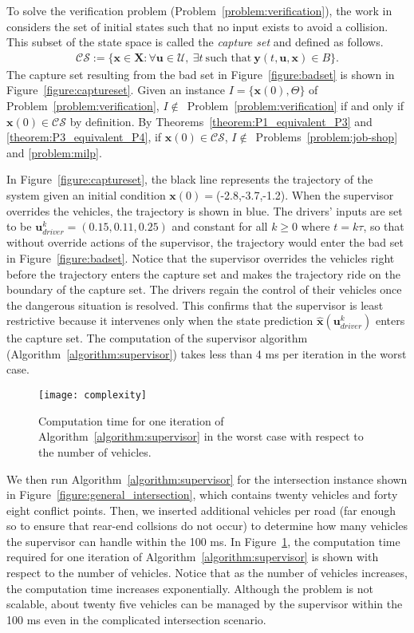 \documentclass{sig-alternate}
\begin{document}
To solve the verification problem (Problem~\ref{problem:verification}), the work in \cite{hafner_cooperative_2013} considers the set of initial states such that no input exists to avoid a collision. This subset of the state space is called the \textit{capture set} and defined as follows.
	\begin{align}\label{equation:capture_Set}
	\mathcal{CS}:=\{\mathbf{x}\in \mathbf{X}: \forall \mathbf{u}\in\mathcal{U},~\exists t~\text{such that}~\mathbf{y}(t,\mathbf{u},\mathbf{x})\in B\}.
	\end{align}
	The capture set resulting from the bad set in Figure~\ref{figure:badset} is shown in Figure~\ref{figure:captureset}.
Given an instance $I=\{\mathbf{x}(0),\Theta\}$ of Problem~\ref{problem:verification}, $I\notin$~Problem~\ref{problem:verification} if and only if $\mathbf{x}(0)\in \mathcal{CS}$ by definition. By Theorems~\ref{theorem:P1_equivalent_P3} and \ref{theorem:P3_equivalent_P4}, if $\mathbf{x}(0)\in\mathcal{CS}$, $I\notin$~Problems~\ref{problem:job-shop} and \ref{problem:milp}.

In Figure~\ref{figure:captureset}, the black line represents the trajectory of the system given an initial condition $\mathbf{x}(0)=$(-2.8,-3.7,-1.2). When the supervisor overrides the vehicles, the trajectory is shown in blue. The drivers' inputs are set to be $\mathbf{u}_{driver}^k=(0.15, 0.11, 0.25)$ and constant for all $k\geq 0$ where $t=k\tau$, so that without override actions of the supervisor, the trajectory would enter the bad set in Figure~\ref{figure:badset}. Notice that the supervisor overrides the vehicles right before the trajectory enters the capture set and makes the trajectory ride on the boundary of the capture set. The drivers regain the control of their vehicles once the dangerous situation is resolved. This confirms that the supervisor is least restrictive because it intervenes only when the state prediction $\hat{\mathbf{x}}(\mathbf{u}_{driver}^k)$ enters the capture set. The computation of the supervisor algorithm (Algorithm~\ref{algorithm:supervisor}) takes less than 4 ms per iteration in the worst case.


\begin{figure}[htb!]
	\texttt{[image: complexity]}
	\caption{Computation time for one iteration of  Algorithm~\ref{algorithm:supervisor} in the worst case with respect to the number of vehicles. }
	\label{figure:complexity}
\end{figure}
We then run Algorithm~\ref{algorithm:supervisor} for the intersection instance shown in Figure~\ref{figure:general_intersection}, which contains twenty vehicles and forty eight conflict points. Then, we inserted additional vehicles per road (far enough so to ensure that rear-end collsions do not occur) to determine how many vehicles the supervisor can handle within the 100 ms. In Figure~\ref{figure:complexity}, the computation time required for one iteration of Algorithm~\ref{algorithm:supervisor} is shown with respect to the number of vehicles. Notice that as the number of vehicles increases, the computation time increases exponentially. Although the problem is not scalable, about twenty five vehicles can be managed by the supervisor within the 100 ms even in the complicated intersection scenario. 
\end{document}
